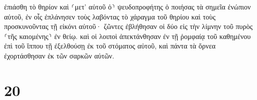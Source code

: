 \documentclass{openreader}
\begin{document}
ἐπιάσθη τὸ θηρίον καὶ ⸂μετ’ αὐτοῦ ὁ⸃ ψευδοπροφήτης ὁ ποιήσας τὰ σημεῖα ἐνώπιον αὐτοῦ, ἐν οἷς ἐπλάνησεν τοὺς λαβόντας τὸ χάραγμα τοῦ θηρίου καὶ τοὺς προσκυνοῦντας τῇ εἰκόνι αὐτοῦ· ζῶντες ἐβλήθησαν οἱ δύο εἰς τὴν λίμνην τοῦ πυρὸς ⸂τῆς καιομένης⸃ ἐν θείῳ. καὶ οἱ λοιποὶ ἀπεκτάνθησαν ἐν τῇ ῥομφαίᾳ τοῦ καθημένου ἐπὶ τοῦ ἵππου τῇ ἐξελθούσῃ ἐκ τοῦ στόματος αὐτοῦ, καὶ πάντα τὰ ὄρνεα ἐχορτάσθησαν ἐκ τῶν σαρκῶν αὐτῶν. \section*{20}
\end{document}
